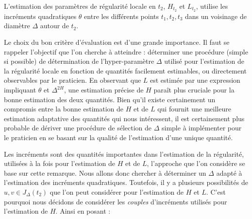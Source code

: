 

L'estimation des paramètres de régularité locale en $t_2$, $H_{t_2}$ et $L_{t_2}$, utilise les incréments quadratiques $\theta$ entre les différents points $t_1, t_2, t_3$ dans un voisinage de diamètre $\Delta$ autour de $t_2$.


Le choix du bon critère d'évaluation est d'une grande importance. Il faut se rappeler l'objectif que l'on cherche à atteindre : déterminer une procédure (simple si possible) de détermination de l'hyper-paramètre $\Delta$ utilisé pour l'estimation de la régularité locale en fonction de quantités facilement estimables, ou directement observables par le praticien. En observant que $L$ est estimée par une expression impliquant $\theta$ et $\Delta^{2 H}$, une estimation précise de $H$ paraît plus cruciale pour la bonne estimation des deux quantités. Bien qu'il existe certainement un compromis entre la bonne estimation de $H$ et de $L$ qui fournit une meilleure estimation adaptative des quantités qui nous intéressent, il est certainement plus probable de dériver une procédure de sélection de $\Delta$ simple à implémenter pour le praticien en se basant sur la qualité de l'estimation d'une unique quantité.


Les incréments sont des quantités importantes dans l'estimation de la régularité, utilisées à la fois pour l'estimation de $H$ et de $L$, l'approche que l'on considère se base sur cette remarque. Nous allons donc chercher à déterminer un $\Delta$ adapté à l'estimation des incréments quadratiques. Toutefois, il y a plusieurs possibilités de $u,v \in J_\Delta(t_2)$ que l'on peut considérer pour l'estimation de $H$ et $L$. C'est pourquoi nous décidons de considérer les \emph{couples} d'incréments utilisés pour l'estimation de $H$. Ainsi en posant :

